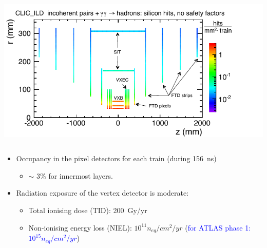 \begin{frame}
\begin{columns}
    \includegraphics[width=\textwidth]{figures/background_vertex.pdf}
  \end{columns}

  \begin{itemize}
  \item Occupancy in the pixel detectors for each train (during
    \SI{156}{\nano\second})
    \begin{itemize}
    \item $\sim$ 3\% for innermost layers.
    \end{itemize} \vspace{0.2cm}
  \item Radiation exposure of the vertex detector is moderate:
    \begin{itemize}
    \item Total ionising dose (TID): 200~Gy/yr
    \item Non-ionising energy loss (NIEL): $10^{11} n_{eq}/cm^{2}/yr$ (\textcolor{blue}{for ATLAS phase 1: $10^{15} n_{eq}/cm^{2}/yr$})
    \end{itemize}
  \end{itemize}

\end{frame}

